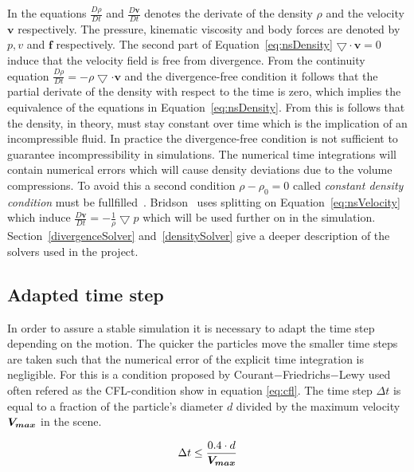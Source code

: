     In the equations $\frac{D\rho}{Dt}$ and $\frac{D\textbf{v}}{Dt}$ denotes the derivate of the density $\rho$ and the velocity $\textbf{v}$ respectively. The pressure, kinematic viscosity and body forces are denoted by $p,v$ and $\textbf{f}$ respectively. The second part of Equation~\ref{eq:nsDensity} $\bigtriangledown \cdot \textbf{v} = 0$ induce that the velocity field is free from divergence. From the continuity equation $\frac{D\rho}{Dt} = -\rho \bigtriangledown \cdot \textbf{v}$ and the divergence-free condition it follows that the partial derivate of the density with respect to the time is zero, which implies the equivalence of the equations in Equation~\ref{eq:nsDensity}. From this is follows that the density, in theory, must stay constant over time which is the implication of an incompressible fluid. In practice the divergence-free condition is not sufficient to guarantee incompressibility in simulations. The numerical time integrations will contain numerical errors which will cause density deviations due to the volume compressions. To avoid this a second condition $\rho - \rho_0 = 0$ called \textit{constant density condition} must be fullfilled~\cite{bender}. Bridson~\cite{bridson} uses splitting on Equation~\ref{eq:nsVelocity} which induce $\frac{D\textbf{v}}{Dt} = -\frac{1}{\rho} \bigtriangledown p$ which will be used further on in the simulation. Section~\ref{divergenceSolver} and~\ref{densitySolver} give a deeper description of the solvers used in the project.


\subsection{Adapted time step}

In order to assure a stable simulation it is necessary to adapt the time step depending on the motion. 
The quicker the particles move the smaller time steps are taken such that the numerical 
error of the explicit time integration is negligible. For this is a condition proposed by 
Courant$-$Friedrichs$-$Lewy used often refered as the CFL-condition show in equation \ref{eq:cfl}. 
The time step $\Delta t$ is equal to a fraction of the particle's diameter $d$ divided by 
the maximum velocity $\bm{V_{max}}$ in the scene.

\begin{equation}\label{eq:cfl}
\Delta t \leq \frac{0.4 \cdot d}{\bm{V_{max}}}
\end{equation}

